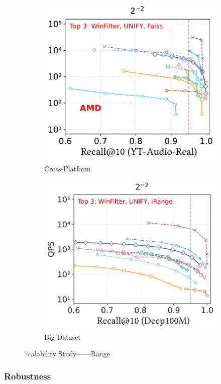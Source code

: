 \documentclass[sigconf, nonacm]{acmart}
\begin{document}
{\begin{figure}[t]
\begin{subfigure}[b]{0.39\textwidth}
		\hfill
		\includegraphics[width=0.47\linewidth]{figures/exp/range_71.pdf}
		\caption{Cross-Platform}
		\label{fig:range-cross-platform}
	\end{subfigure}
	\hfill %
	\begin{subfigure}[b]{0.203\textwidth}
		\centering
		\includegraphics[width=0.96\linewidth]{figures/exp/range_deep100M.pdf} 
		\caption{Big Dataset}
		\label{fig: range big dataset}
	\end{subfigure}
	
	\caption{\textcolor{violet}Scalability Study——Range}
	\label{fig:TrinityExtension——Attribution_main}
\end{figure}
	
	\subsubsection{Robustness}
	
}
\end{document}
